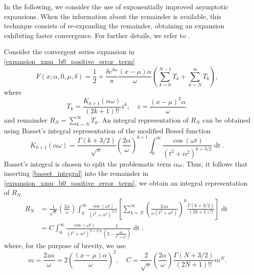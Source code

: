 \documentclass[10pt,a4paper,oneside]{article}
\numberwithin{equation}{section}
\begin{document}
In the following, we consider the use of exponentially improved asymptotic expansions. When the information about the remainder is available, this technique consists of re-expanding the remainder, obtaining an expansion exhibiting faster convergence. For further details, we refer to \cite[\S 14]{Olver1997}.

Consider the convergent series expansion in \eqref{expansion_xmu_b0_positive_error_term}
\begin{equation}
F(x;\alpha, 0, \mu, \delta) = \frac{1}{2} + \frac{\delta e^{\delta \alpha}}{\pi} \frac{(x-\mu)\alpha}{\omega} \left(\sum_{k=0}^{N-1} T_k + \sum_{k=N}^{\infty} T_k\right),
\end{equation}
where
\begin{equation}
T_k = \frac{K_{k+1}(\alpha\omega)}{(2k + 1)!!} z^k, \quad z = \frac{(x-\mu)^2 \alpha}{\omega}.
\end{equation}
and remainder $R_N = \sum_{k=N}^{\infty} T_k$. An integral representation of $R_N$ can be obtained using Basset's integral \cite[\S 10.32.11]{NIST:DLMF} representation of the modified Bessel function
\begin{equation}\label{basset_integral}
K_{k+1}(\alpha\omega) = \frac{\Gamma(k + 3/2)}{\sqrt{\pi}}\left(\frac{2\alpha}{\omega}\right)^{k+1} \int_0^{\infty} \frac{\cos(\omega t)}{(t^2 + \alpha^2)^{k + 3/2}} \mathop{dt}.
\end{equation}
Basset's integral is chosen to split the problematic term $\alpha\omega$. Thus, it follows that inserting \eqref{basset_integral} into the remainder in \eqref{expansion_xmu_b0_positive_error_term}, we obtain an integral representation of $R_N$
\begin{align}\label{convergent_remainder_integral}
R_N &= \frac{1}{\sqrt{\pi}} \left(\frac{2\alpha}{\omega}\right) \int_0^{\infty} \frac{\cos(\omega t)}{(t^2 + \alpha^2)^{3/2}} \left[\sum_{k=N}^{\infty} \left(\frac{2z\alpha}{\omega (t^2 + \alpha^2)}\right)^k \frac{\Gamma(k + 3/2)}{(2k + 1)!!}\right] \mathop{dt}\nonumber\\
&= C \int_0^{\infty} \frac{\cos(\omega t)}{(t^2 + \alpha^2)^{N + 3/2}} \frac{1}{\left(2 - \frac{m}{t^2+ \alpha^2}\right)} \mathop{dt}.
\end{align}
where, for the purpose of brevity, we use
\begin{equation}
m = \frac{2z\alpha}{\omega} = 2\left(\frac{(x-\mu)\alpha}{\omega}\right)^2,  \quad C = \frac{2}{\sqrt{\pi}} \left(\frac{2\alpha}{\omega}\right)\frac{\Gamma(N + 3/2)}{(2N + 1)!!} m^N.
\end{equation}
\end{document}
